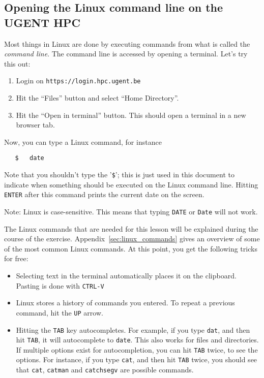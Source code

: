 \documentclass[a4paper]{article}
\begin{document}
\subsection{Opening the Linux command line on the UGENT HPC}
%
\par
Most things in Linux are done by executing commands from what is called the \emph{command line}. The command line is accessed by opening a terminal. Let's try this out:
%
\begin{enumerate}
	\item Login on \texttt{https://login.hpc.ugent.be}
	\item Hit the ``Files'' button and select ``Home Directory''.
	\item Hit the ``Open in terminal'' button. This should open a terminal in a new browser tab.
\end{enumerate}
%
Now, you can type a Linux command, for instance
%
\begin{verbatim}
   $   date
\end{verbatim}
%
Note that you shouldn't type the '\texttt{\$}'; this is just used in this document to indicate when something should be executed on the Linux command line. Hitting \texttt{ENTER} after this command prints the current date on the screen.
%
\par
Note: Linux is case-sensitive. This means that typing \verb+DATE+ or \verb+Date+ will not work.
%
\par
The Linux commands that are needed for this lesson will be explained during the course of the exercise. Appendix~\ref{sec:linux_commands} gives an overview of some of the most common Linux commands. At this point, you get the following tricks for free:
%
\begin{itemize}
	\item Selecting text in the terminal automatically places it on the clipboard. Pasting is done with \texttt{CTRL-V}
	\item Linux stores a history of commands you entered. To repeat a previous command, hit the \texttt{UP} arrow.
	\item Hitting the \texttt{TAB} key autocompletes. For example, if you type \texttt{dat}, and then hit \texttt{TAB}, it will autocomplete to \texttt{date}. This also works for files and directories. If multiple options exist for autocompletion, you can hit \texttt{TAB} twice, to see the options. For instance, if you type \texttt{cat}, and then hit \texttt{TAB} twice, you should see that \texttt{cat}, \texttt{catman} and \texttt{catchsegv} are possible commands.
\end{itemize}
%
\end{document}
